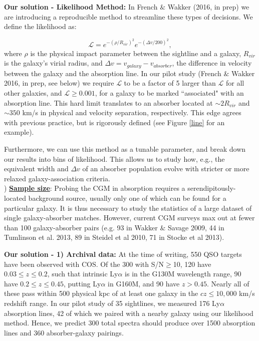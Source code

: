 \documentclass[12pt]{article}
\begin{document}
\textbf{Our solution - Likelihood Method: } In French $\&$ Wakker (2016, in prep) we are introducing a reproducible method to streamline these types of decisions. We define the likelihood as:

\begin{equation}
	\mathcal{L} = e^{-(\rho/R_{vir})^2} e^{-(\Delta v / 200)^2},
\end{equation}
where $\rho$ is the physical impact parameter between the sightline and a galaxy, $R_{vir}$ is the galaxy's virial radius, and $\Delta v = v_{galaxy} - v_{absorber}$, the difference in velocity between the galaxy and the absorption line. In our pilot study (French $\&$ Wakker 2016, in prep, see below) we require $\mathcal{L}$ to be a factor of 5 larger than $\mathcal{L}$ for all other galaxies, and $\mathcal{L} \geq 0.001$, for a galaxy to be marked ``associated" with an absorption line. This hard limit translates to an absorber located at $\sim 2 R_{vir}$ and $\sim 350$ km/s in physical and velocity separation, respectively. This edge agrees with previous practice, but is rigorously defined (see Figure \ref{line} for an example). 

Furthermore, we can use this method as a tunable parameter, and break down our results into bins of likelihood. This allows us to study how, e.g., the equivalent width and $\Delta v$ of an absorber population evolve with stricter or more relaxed galaxy-association criteria.\\


) \textbf{\underline{Sample size}}: Probing the CGM in absorption requires a serendipitously-located background source, usually only one of which can be found for a particular galaxy. It is thus necessary to study the statistics of a large dataset of single galaxy-absorber matches. However, current CGM surveys max out at fewer than 100 galaxy-absorber pairs (e.g. 93 in Wakker $\&$ Savage 2009, 44 in Tumlinson et al. 2013, 89 in Steidel et al 2010, 71 in Stocke et al 2013).

\textbf{Our solution - 1) Archival data:} At the time of writing, 550 QSO targets have been observed with COS. Of the 300 with S/N$\geq$10, 120 have $0.03\leq z \leq 0.2$, such that intrinsic Ly$\alpha$ is in the G130M wavelength range, 90 have $0.2\leq z \leq 0.45$, putting Ly$\alpha$ in G160M, and 90 have $z > 0.45$. Nearly all of these pass within 500 physical kpc of at least one galaxy in the $cz \leq 10,000$ km/s redshift range. In our pilot study of 35 sightlines, we measured 176 Ly$\alpha$ absorption lines, 42 of which we paired with a nearby galaxy using our likelihood method. Hence, we predict 300 total spectra should produce over 1500 absorption lines and 360 absorber-galaxy pairings.
\end{document}
